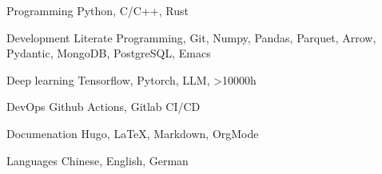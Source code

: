 \documentclass[../cv.tex]{subfiles}
\begin{document}


\begin{cvskills}

  \cvskill
    {Programming} %
    {Python, C/C++, Rust} %

  \cvskill
    {Development} %
    {Literate Programming, Git, Numpy, Pandas, Parquet, Arrow, Pydantic, MongoDB, PostgreSQL, Emacs} %

  \cvskill
    {Deep learning} %
    {Tensorflow, Pytorch, LLM, >10000h} %

  \cvskill
    {DevOps} %
    {Github Actions, Gitlab CI/CD} %

  \cvskill
    {Documenation} %
    {Hugo, LaTeX, Markdown, OrgMode} %

  \cvskill
    {Languages} %
    {Chinese, English, German} %

\end{cvskills}
\end{document}
